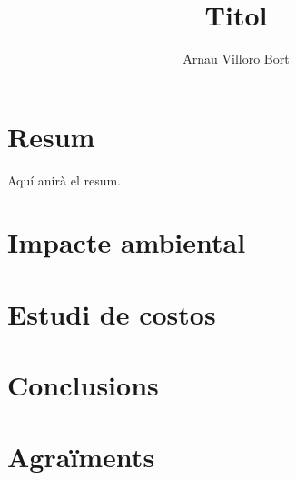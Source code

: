 \documentclass{book}
\title{Titol}
\author{Arnau Villoro Bort}
\begin{document}
\frontmatter




\chapter*{Resum} \label{sec:Resum}
Aquí anirà el resum.

\tableofcontents





\mainmatter








\chapter{Impacte ambiental}
\chapter{Estudi de costos}

\chapter{Conclusions}
\chapter{Agraïments}


\end{document}
